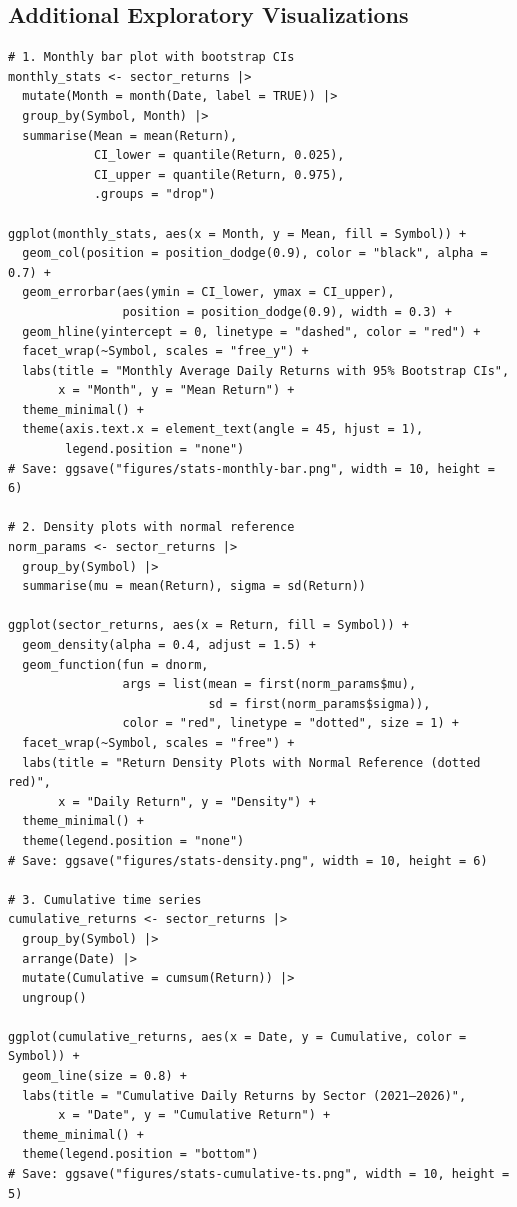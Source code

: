 \documentclass[12pt,a4paper,fleqn]{article}
\begin{document}
\subsection*{Additional Exploratory Visualizations}
\begin{tcolorbox}[colback=gray!5, colframe=black!70, fontupper=\small, breakable, title=R Code]
\begin{verbatim}
# 1. Monthly bar plot with bootstrap CIs
monthly_stats <- sector_returns |>
  mutate(Month = month(Date, label = TRUE)) |>
  group_by(Symbol, Month) |>
  summarise(Mean = mean(Return),
            CI_lower = quantile(Return, 0.025),
            CI_upper = quantile(Return, 0.975),
            .groups = "drop")

ggplot(monthly_stats, aes(x = Month, y = Mean, fill = Symbol)) +
  geom_col(position = position_dodge(0.9), color = "black", alpha = 0.7) +
  geom_errorbar(aes(ymin = CI_lower, ymax = CI_upper),
                position = position_dodge(0.9), width = 0.3) +
  geom_hline(yintercept = 0, linetype = "dashed", color = "red") +
  facet_wrap(~Symbol, scales = "free_y") +
  labs(title = "Monthly Average Daily Returns with 95% Bootstrap CIs",
       x = "Month", y = "Mean Return") +
  theme_minimal() +
  theme(axis.text.x = element_text(angle = 45, hjust = 1),
        legend.position = "none")
# Save: ggsave("figures/stats-monthly-bar.png", width = 10, height = 6)

# 2. Density plots with normal reference
norm_params <- sector_returns |>
  group_by(Symbol) |>
  summarise(mu = mean(Return), sigma = sd(Return))

ggplot(sector_returns, aes(x = Return, fill = Symbol)) +
  geom_density(alpha = 0.4, adjust = 1.5) +
  geom_function(fun = dnorm, 
                args = list(mean = first(norm_params$mu), 
                            sd = first(norm_params$sigma)),
                color = "red", linetype = "dotted", size = 1) +
  facet_wrap(~Symbol, scales = "free") +
  labs(title = "Return Density Plots with Normal Reference (dotted red)",
       x = "Daily Return", y = "Density") +
  theme_minimal() +
  theme(legend.position = "none")
# Save: ggsave("figures/stats-density.png", width = 10, height = 6)

# 3. Cumulative time series
cumulative_returns <- sector_returns |>
  group_by(Symbol) |>
  arrange(Date) |>
  mutate(Cumulative = cumsum(Return)) |>
  ungroup()

ggplot(cumulative_returns, aes(x = Date, y = Cumulative, color = Symbol)) +
  geom_line(size = 0.8) +
  labs(title = "Cumulative Daily Returns by Sector (2021–2026)",
       x = "Date", y = "Cumulative Return") +
  theme_minimal() +
  theme(legend.position = "bottom")
# Save: ggsave("figures/stats-cumulative-ts.png", width = 10, height = 5)


\end{verbatim}
\end{tcolorbox}
\end{document}
